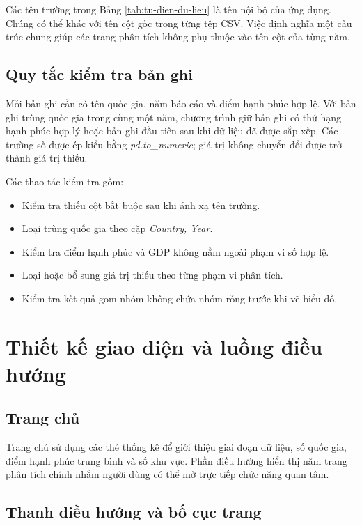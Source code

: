 Các tên trường trong Bảng \ref{tab:tu-dien-du-lieu} là tên nội bộ của ứng dụng. Chúng có thể khác với tên cột gốc trong từng tệp CSV. Việc định nghĩa một cấu trúc chung giúp các trang phân tích không phụ thuộc vào tên cột của từng năm.

\subsection{Quy tắc kiểm tra bản ghi}

Mỗi bản ghi cần có tên quốc gia, năm báo cáo và điểm hạnh phúc hợp lệ. Với bản ghi trùng quốc gia trong cùng một năm, chương trình giữ bản ghi có thứ hạng hạnh phúc hợp lý hoặc bản ghi đầu tiên sau khi dữ liệu đã được sắp xếp. Các trường số được ép kiểu bằng \textit{pd.to\_numeric}; giá trị không chuyển đổi được trở thành giá trị thiếu.

Các thao tác kiểm tra gồm:

\begin{itemize}
    \item Kiểm tra thiếu cột bắt buộc sau khi ánh xạ tên trường.
    \item Loại trùng quốc gia theo cặp \textit{Country, Year}.
    \item Kiểm tra điểm hạnh phúc và GDP không nằm ngoài phạm vi số hợp lệ.
    \item Loại hoặc bổ sung giá trị thiếu theo từng phạm vi phân tích.
    \item Kiểm tra kết quả gom nhóm không chứa nhóm rỗng trước khi vẽ biểu đồ.
\end{itemize}

\section{Thiết kế giao diện và luồng điều hướng}

\subsection{Trang chủ}

Trang chủ sử dụng các thẻ thống kê để giới thiệu giai đoạn dữ liệu, số quốc gia, điểm hạnh phúc trung bình và số khu vực. Phần điều hướng hiển thị năm trang phân tích chính nhằm người dùng có thể mở trực tiếp chức năng quan tâm.

\subsection{Thanh điều hướng và bố cục trang}

